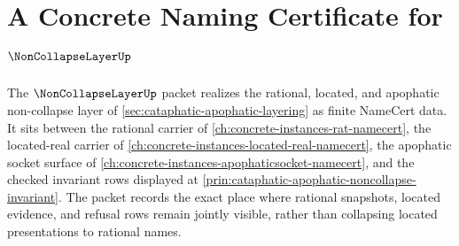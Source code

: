 \chapter{A Concrete Naming Certificate for $\NonCollapseLayerUp$}
\label{ch:concrete-instances-noncollapse-layer-namecert}

The $\NonCollapseLayerUp$ packet realizes the rational, located, and apophatic non-collapse layer of \autoref{sec:cataphatic-apophatic-layering} as finite NameCert data. It sits between the rational carrier of \autoref{ch:concrete-instances-rat-namecert}, the located-real carrier of \autoref{ch:concrete-instances-located-real-namecert}, the apophatic socket surface of \autoref{ch:concrete-instances-apophaticsocket-namecert}, and the checked invariant rows displayed at \autoref{prin:cataphatic-apophatic-noncollapse-invariant}. The packet records the exact place where rational snapshots, located evidence, and refusal rows remain jointly visible, rather than collapsing located presentations to rational names.

